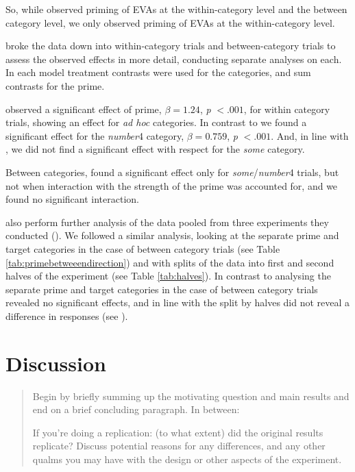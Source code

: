 \documentclass[10pt]{article}
\begin{document}
\begin{multicols}{2}
So, while \citeauthor{Bott:2016aa} observed priming of EVAs at the within-category level and the between category level, we only observed priming of EVAs at the within-category level.

\citeauthor{Bott:2016aa} broke the data down into within-category trials and between-category trials to assess the observed effects in more detail, conducting separate analyses on each.
In each model treatment contrasts were used for the categories, and sum contrasts for the prime.

\citeauthor{Bott:2016aa} observed a significant effect of prime, \(\beta = 1.24\), \emph{p} \(< .001\), for within category trials, showing an effect for \emph{ad hoc} categories.
In contrast to \citeauthor{Bott:2016aa} we found a significant effect for the \emph{number}4 category, \(\beta = 0.759\), \emph{p} \(< .001\).
And, in line with \citeauthor{Bott:2016aa}, we did not find a significant effect with respect for the \emph{some} category.

Between categories, \citeauthor{Bott:2016aa} found a significant effect only for \emph{some}/\emph{number}4 trials, but not when interaction with the strength of the prime was accounted for, and we found no significant interaction.

\citeauthor{Bott:2016aa} also perform further analysis of the data pooled from three experiments they conducted (\citeyear[132--133]{Bott:2016aa}).
We followed a similar analysis, looking at the separate prime and target categories in the case of between category trials (see Table \ref{tab:primebetweeendirection}) and with splits of the data into first and second halves of the experiment (see Table \ref{tab:halves}).
In contrast to \citeauthor{Bott:2016aa} analysing the separate prime and target categories in the case of between category trials revealed no significant effects, and in line with \citeauthor{Bott:2016aa} the split by halves did not reveal a difference in responses (see \textcite[Table 4, 134]{Bott:2016aa}).

\section{Discussion}
\label{sec:discussion}

\begin{quote}
  Begin by briefly summing up the motivating question and main results and end on a brief concluding paragraph. In between:

  If you're doing a replication: (to what extent) did the original results replicate? Discuss potential reasons for any differences, and any other qualms you may have with the design or other aspects of the experiment.


\end{quote}
\end{multicols}
\end{document}
